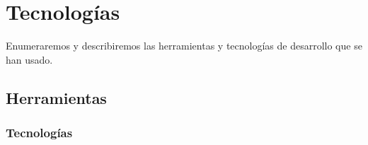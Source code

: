 \chapter{Tecnologías}

\bigskip
Enumeraremos y describiremos las herramientas y tecnologías de desarrollo que se han usado.

\newpage
\section{Herramientas}




\subsection{Tecnologías}








